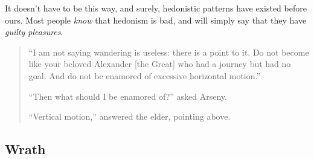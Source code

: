\documentclass[letterpaper]{article}
\begin{document}
It doesn't have to be this way, and surely, hedonistic patterns have existed before ours. Most people \textit{know} that hedonism is bad, and will simply say that they have \textit{guilty pleasures}. 

\begin{quote}
  ``I am not saying wandering is useless: there is a point to it. Do not become like your beloved Alexander [the Great] who had a journey but had no goal. And do not be enamored of excessive horizontal motion.''

  ``Then what should I be enamored of?'' asked Arseny.

  ``Vertical motion,'' answered the elder, pointing above.
\end{quote}

\subsection{Wrath}

\hfill

\hfill

\hfill

\hfill

\hfill

\hfill



\end{document}
